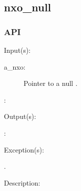 %
%
%
%
%              

\subsection{nxo\_null}
\label{nxo_null}

\subsubsection{API}
\begin{capi}
\label{nxo_null_}
	\begin{capilist}
	\item[Input(s): ]
		\begin{description}\item[]
		\item[a\_nxo: ]
			Pointer to a null .
		\item[: ]
		\end{description}
	\item[Output(s): ]
		\begin{description}\item[]
		\item[: ]
		\end{description}
	\item[Exception(s): ]
		\begin{description}\item[]
		\item[.]
		\end{description}
	\item[Description: ]
	\end{capilist}
\end{capi}

